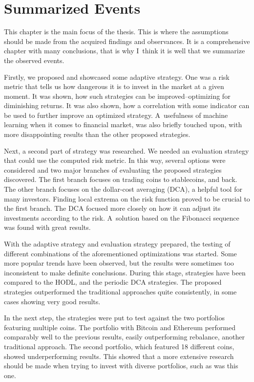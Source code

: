 \section{Summarized Events}
\label{section-summarized-events}
This chapter is the main focus of the thesis. This is where the assumptions should be made from the acquired findings and observances. It is a comprehensive chapter with many conclusions, that is why I~think it is well that we summarize the observed events.

Firstly, we proposed and showcased some adaptive strategy. One was a risk metric that tells us how dangerous it is to invest in the market at a given moment. It was shown, how such strategies can be improved--optimizing for diminishing returns. It was also shown, how a correlation with some indicator can be used to further improve an optimized strategy. A~usefulness of machine learning when it comes to financial market, was also briefly touched upon, with more disappointing results than the other proposed strategies.

Next, a second part of strategy was researched. We needed an evaluation strategy that could use the computed risk metric. In this way, several options were considered and two major branches of evaluating the proposed strategies discovered. The first branch focuses on trading coins to stablecoins, and back. The other branch focuses on the dollar-cost averaging (DCA), a helpful tool for many investors. Finding local extrema on the risk function proved to be crucial to the first branch. The DCA focused more closely on how it can adjust its investments according to the risk. A~solution based on the Fibonacci sequence was found with great results.

With the adaptive strategy and evaluation strategy prepared, the testing of different combinations of the aforementioned optimizations was started. Some more popular trends have been observed, but the results were sometimes too inconsistent to make definite conclusions. During this stage, strategies have been compared to the HODL, and the periodic DCA strategies. The proposed strategies outperformed the traditional approaches quite consistently, in some cases showing very good results.

In the next step, the strategies were put to test against the two portfolios featuring multiple coins. The portfolio with Bitcoin and Ethereum performed comparably well to the previous results, easily outperforming rebalance, another traditional approach. The second portfolio, which featured 18 different coins, showed underperforming results. This showed that a more extensive research should be made when trying to invest with diverse portfolios, such as was this one.

